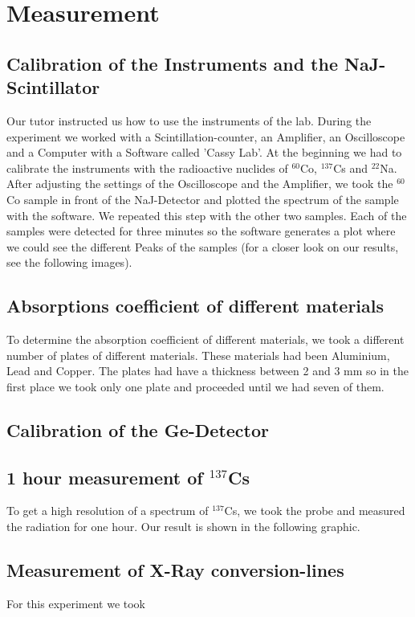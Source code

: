 \section{Measurement}

\subsection{Calibration of the Instruments and the NaJ-Scintillator}
Our tutor instructed us how to use the instruments of the lab. During the experiment we worked with a Scintillation-counter, an Amplifier, an Oscilloscope and a Computer with a Software called 'Cassy Lab'. At the beginning we had to calibrate the instruments with the radioactive nuclides of $^{60}$Co, $^{137}$Cs and $^{22}$Na. After adjusting the settings of the Oscilloscope and the Amplifier, we took the $^{60}$Co sample in front of the NaJ-Detector and plotted the spectrum of the sample with the software. We repeated this step with the other two samples. Each of the samples were detected for three minutes so the software generates a plot where we could see the different Peaks of the samples (for a closer look on our results, see the following images).

\subsection{Absorptions coefficient of different materials}
To determine the absorption coefficient of different materials, we took a different number of plates of different materials. These materials had been Aluminium, Lead and Copper. The plates had have a thickness between 2 and 3 mm so in the first place we took only one plate and proceeded until we had seven of them. 

\subsection{Calibration of the Ge-Detector}

\subsection{1 hour measurement of $^{137}$Cs}
To get a high resolution of a spectrum of $^{137}$Cs, we took the probe and measured the radiation for one hour. Our result is shown in the following graphic.


\subsection{Measurement of X-Ray conversion-lines}
For this experiment we took 
